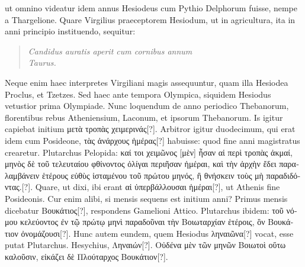 ut omnino videatur idem annus Hesiodeus cum
Pythio Delphorum fuisse, nempe a Thargelione.
Quare Virgilius
praeceptorem Hesiodum, ut in agricultura, ita in anni principio
instituendo, sequitur:
\begin{verse}
  \textit{Candidus auratis aperit cum cornibus annum}\\
  \textit{Taurus.}\emd{}
\end{verse}
Neque enim haec interpretes Virgiliani magis assequuntur, quam illa
Hesiodea Proclus, et Tzetzes.
Sed haec ante tempora Olympica, siquidem
Hesiodus vetustior prima Olympiade.
Nunc loquendum de
anno periodico Thebanorum, florentibus rebus Atheniensium, Laconum,
et ipsorum Thebanorum.
Is igitur capiebat initium \textgreek{μετὰ τροπὰς
χειμερινάς[?]}.
Arbitror igitur duodecimum, qui erat idem cum Posideone,
\textgreek{τὰς ἀνάρχους ἡμέρας[?]} habuisse: quod fine anni magistratus
crearetur.
%
Plutarchus Pelopida:
 \textgreek{καί τοι χειμῶνος [μὲν] ἦσαν αἱ περὶ τροπὰς
ἀκμαί, μηνὸς δὲ τοῦ τελευταίου φθίνοντος ὀλίγαι περιῆσαν ἡμέραι, καὶ
τὴν ἀρχὴν ἔδει παραλαμβάνειν ἑτέρους εὐθὺς ἱσταμένου τοῦ πρώτου μηνός, ἢ
θνήσκειν τοὺς μὴ παραδιδόντας.[?]}.
Quare, ut dixi, ibi erant \textgreek{αἱ ὑπερβάλλουσαι
ἡμέραι[?]}, ut Athenis fine Posideonis.
Cur enim alibi, si mensis sequens
est initium anni?
Primus mensis dicebatur \textgreek{Βουκάτιος[?]}, respondens
Gamelioni Attico.
Plutarchus ibidem: \textgreek{τοῦ νόμου κελεύοντος ἐν τῷ πρώτῳ
μηνὶ παραδοῦναι τὴν Bοιωταρχίαν ἑτέροις, ὃν Βουκάτιον ὀνομάζουσι[?]}.
Hunc
autem eundem, quem Hesiodus \textgreek{ληναιῶνα[?]} vocat,
 esse putat Plutarchus.
Hesychius, \textgreek{Ληναιών[?]}.
\textgreek{Οὐδένα μὲν τῶν μηνῶν Βοιωτοὶ οὕτω καλοῦσιν,
εἰκάζει δὲ Πλούταρχος Βουκάτιον[?]}.
